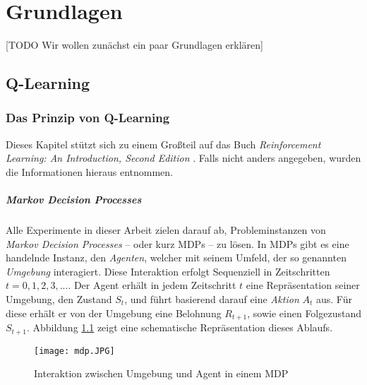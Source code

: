 \chapter{Grundlagen} \label{sec:basics}
[TODO Wir wollen zunächst ein paar Grundlagen erklären]
\section{Q-Learning}
\subsection{Das Prinzip von Q-Learning}
Dieses Kapitel stützt sich zu einem Großteil auf das Buch \textit{Reinforcement Learning: An Introduction, Second Edition} \cite{06_sutton2018reinforcement}. Falls nicht anders angegeben, wurden die Informationen hieraus entnommen.

\paragraph{Markov Decision Processes}
Alle Experimente in dieser Arbeit zielen darauf ab, Probleminstanzen von \textit{Markov Decision Processes} -- oder kurz MDPs -- zu lösen. In MDPs gibt es eine handelnde Instanz, den \textit{Agenten}, welcher mit seinem Umfeld, der so genannten \textit{Umgebung} interagiert. Diese Interaktion erfolgt Sequenziell in Zeitschritten $ t = 0, 1, 2, 3, ... $. Der Agent erhält in jedem Zeitschritt $ t $ eine Repräsentation seiner Umgebung, den Zustand $ S_t $, und führt basierend darauf eine \textit{Aktion} $ A_t $ aus. Für diese erhält er von der Umgebung eine Belohnung $ R_{t + 1} $, sowie einen Folgezustand $ S_{t + 1} $. Abbildung \ref{img:mdp} zeigt eine schematische Repräsentation dieses Ablaufs.
\begin{figure}[h!]
    \centering
    \texttt{[image: mdp.JPG]}
    \caption{Interaktion zwischen Umgebung und Agent in einem MDP} \label{img:mdp}
\end{figure}

